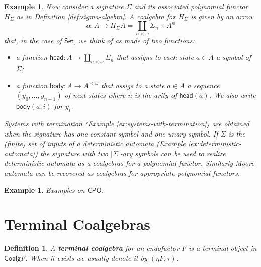 \documentclass[letterpaper, 11pt, oneside]{memoir}
\theoremstyle{myteo}
\newtheorem{definition}[theorem]{Definition}
\newtheorem{example}[theorem]{Example}
\numberwithin{equation}{section}
\newcommand{\marginnote}[1]{\marginpar{\footnotesize #1}}
\newcommand{\head}{\textsf{head}}
\newcommand{\body}{\textsf{body}}
\newcommand{\Coalg}{\textsf{Coalg}}
\newcommand{\Set}{\textsf{Set}}
\newcommand{\CPO}{\textsf{CPO}}
\begin{document}
\begin{example}
  Now consider a signature \(\Sigma\) and its associated polynomial functor \(H_\Sigma\) as in Definition \ref{def:sigma-algebra}.
  A coalgebra for \(H_\Sigma\) is given by an arrow
  \begin{equation*}
    \alpha : A \to H_\Sigma A = \coprod_{n < \omega}\Sigma_n \times A^n
  \end{equation*}
  that, in the case of \(\Set\), we think of as made of two functions:
  \begin{itemize}
  \item a function \(\head : A \to \coprod_{n < \omega}\Sigma_n\) that assigns to each state \(a \in A\) a symbol of \(\Sigma\);
  \item a function \(\body : A \to A^{<\omega}\) that assigs to a state \(a \in A\) a sequence \((y_0, \ldots, y_{n-1})\) of next states where \(n\) is the arity of \(\head(a)\). We also write \(\body(a, i)\) for \(y_i\).
  \end{itemize}

  Systems with termination (Example \ref{ex:systems-with-termination}) are obtained when the signature has one constant symbol and one unary symbol.
  If \(\Sigma\) is the (finite) set of inputs of a deterministic automata (Example \ref{ex:deterministic-automata}) the signature with two \(|\Sigma|\)-ary symbols can be used to realize deterministic automata as a coalgebras for a polynomial functor.
  Similarly Moore automata can be recovered as coalgebras for appropriate polynomial functors.
\end{example}

\begin{example}
  Examples on \(\CPO\).
\end{example}

\section{Terminal Coalgebras}

\begin{definition}
  A \textbf{terminal coalgebra}\marginnote{terminal coalgebra} for an endofuctor \(F\) is a terminal object in \(\Coalg F\).
  When it exists we usually denote it by \((\eta F, \tau)\).
\end{definition}
\end{document}
